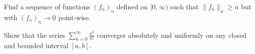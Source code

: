 \documentclass[10pt,twoside,openany]{memoir}
\begin{document}
    \begin{exercise}
        Find a sequence of functions $(f_n)_n$ defined on $[0,\infty)$ such that $\lVert f_n\rVert _u \geq n$ but with $(f_n)_n \rightarrow 0$ point-wise.
    \end{exercise}
    \begin{exercise}
        Show that the series $\sum_{k = 0}^\infty \frac{x^k}{k!}$ converges absolutely and uniformly on any closed and bounded interval $[a,b]$.
    \end{exercise}
\end{document}
